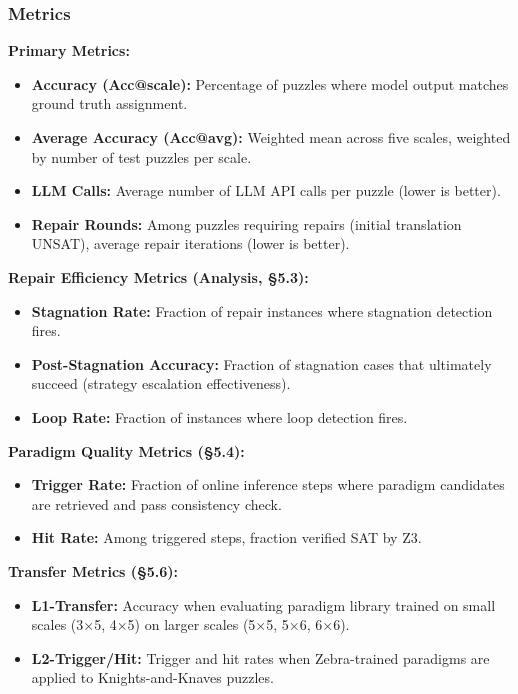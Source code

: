 \subsubsection{Metrics}

\textbf{Primary Metrics:}
\begin{itemize}
    \item \textbf{Accuracy (Acc@scale):} Percentage of puzzles where model output matches ground truth assignment.
    \item \textbf{Average Accuracy (Acc@avg):} Weighted mean across five scales, weighted by number of test puzzles per scale.
    \item \textbf{LLM Calls:} Average number of LLM API calls per puzzle (lower is better).
    \item \textbf{Repair Rounds:} Among puzzles requiring repairs (initial translation UNSAT), average repair iterations (lower is better).
\end{itemize}

\textbf{Repair Efficiency Metrics (Analysis, §5.3):}
\begin{itemize}
    \item \textbf{Stagnation Rate:} Fraction of repair instances where stagnation detection fires.
    \item \textbf{Post-Stagnation Accuracy:} Fraction of stagnation cases that ultimately succeed (strategy escalation effectiveness).
    \item \textbf{Loop Rate:} Fraction of instances where loop detection fires.
\end{itemize}

\textbf{Paradigm Quality Metrics (§5.4):}
\begin{itemize}
    \item \textbf{Trigger Rate:} Fraction of online inference steps where paradigm candidates are retrieved and pass consistency check.
    \item \textbf{Hit Rate:} Among triggered steps, fraction verified SAT by Z3.
\end{itemize}

\textbf{Transfer Metrics (§5.6):}
\begin{itemize}
    \item \textbf{L1-Transfer:} Accuracy when evaluating paradigm library trained on small scales (3×5, 4×5) on larger scales (5×5, 5×6, 6×6).
    \item \textbf{L2-Trigger/Hit:} Trigger and hit rates when Zebra-trained paradigms are applied to Knights-and-Knaves puzzles.
\end{itemize}

